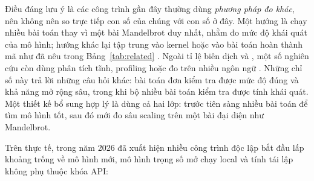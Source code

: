Điều đáng lưu ý là các công trình gần đây thường dùng \emph{phương pháp đo khác},
nên không nên so trực tiếp con số của chúng với con số ở đây. Một hướng là chạy
nhiều bài toán thay vì một bài Mandelbrot duy nhất, nhằm đo mức độ khái quát của
mô hình; hướng khác lại tập trung vào kernel hoặc vào bài toán hoàn thành mã như
đã nêu trong Bảng~\ref{tab:related} \cite{chaturvedi2025hpccoderv2}.
Ngoài tỉ lệ biên dịch và , một số nghiên cứu còn dùng phân tích tĩnh,
profiling hoặc đo trên nhiều ngôn ngữ \cite{chen2023llm4hpc}. Những chỉ số này trả
lời những câu hỏi khác: bài toán đơn kiểm tra được mức độ đúng và khả năng mở rộng
sâu, trong khi bộ nhiều bài toán kiểm tra được tính khái quát. Một thiết kế bổ sung
hợp lý là dùng cả hai lớp: trước tiên sàng nhiều bài toán để tìm mô hình tốt, sau
đó mới đo sâu scaling trên một bài đại diện như Mandelbrot.

Trên thực tế, trong năm 2026 đã xuất hiện nhiều công trình độc lập bắt đầu lấp
khoảng trống về mô hình mới, mô hình trọng số mở chạy local và tính tái lập không
phụ thuộc khóa API:

